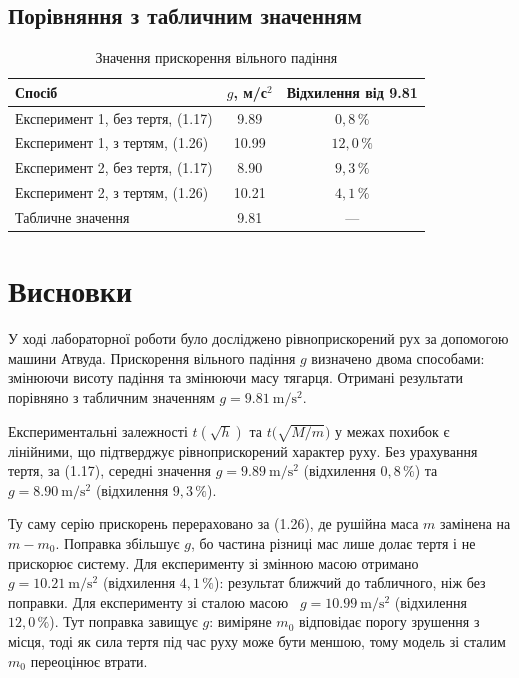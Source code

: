 \documentclass[ukrainian]{ucaphyslab}
\begin{document}
\subsection{Порівняння з табличним значенням}

\begin{table}[H]
  \centering
  \begin{tabular}{@{}lcc@{}}
    \toprule
    Спосіб & $g$, м/с$^2$ & Відхилення від \num{9.81} \\
    \midrule
    Експеримент 1, без тертя, (1.17) & \num{9.89} & $0{,}8\,\%$ \\
    Експеримент 1, з тертям, (1.26) & \num{10.99} & $12{,}0\,\%$ \\
    Експеримент 2, без тертя, (1.17) & \num{8.90} & $9{,}3\,\%$ \\
    Експеримент 2, з тертям, (1.26) & \num{10.21} & $4{,}1\,\%$ \\
    \midrule
    Табличне значення & \num{9.81} & --- \\
    \bottomrule
  \end{tabular}
  \caption{Значення прискорення вільного падіння}
\end{table}

\section{Висновки}
У ході лабораторної роботи було досліджено рівноприскорений рух за допомогою машини Атвуда.
Прискорення вільного падіння $g$ визначено двома способами: змінюючи висоту падіння та
змінюючи масу тягарця. Отримані результати порівняно з табличним значенням
$g = \SI{9.81}{\meter\per\second\squared}$.

Експериментальні залежності $t(\sqrt h)$ та $t\bigl(\sqrt{M/m}\bigr)$ у межах похибок є лінійними,
що підтверджує рівноприскорений характер руху. Без урахування тертя, за (1.17), середні значення
$g = \SI{9.89}{\meter\per\second\squared}$ (відхилення $0{,}8\,\%$) та
$g = \SI{8.90}{\meter\per\second\squared}$ (відхилення $9{,}3\,\%$).

Ту саму серію прискорень перераховано за (1.26), де рушійна маса $m$ замінена на $m-m_0$.
Поправка збільшує $g$, бо частина різниці мас лише долає тертя і не прискорює систему.
Для експерименту зі змінною масою отримано
$g = \SI{10.21}{\meter\per\second\squared}$ (відхилення $4{,}1\,\%$): результат ближчий до табличного,
ніж без поправки. Для експерименту зі сталою масою~
$g = \SI{10.99}{\meter\per\second\squared}$ (відхилення $12{,}0\,\%$). Тут поправка завищує $g$:
виміряне $m_0$ відповідає порогу зрушення з місця, тоді як сила тертя під час руху може бути меншою,
тому модель зі сталим $m_0$ переоцінює втрати.
\end{document}
